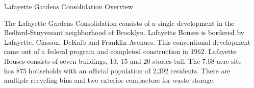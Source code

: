 Lafayette Gardens Consolidation Overview

The Lafayette Gardens Consolidation consists of a single development in the Bedford-Stuyvesant neighborhood of Brooklyn. Lafayette Houses is bordered by Lafayette, Classon, DeKalb and Franklin Avenues. This conventional development came out of a federal program and completed construction in 1962. Lafayette Houses consists of seven buildings, 13, 15 and 20-stories tall. The 7.68 acre site has 875 households with an official population of 2,392 residents. There are multiple recycling bins and two exterior compactors for waste storage.